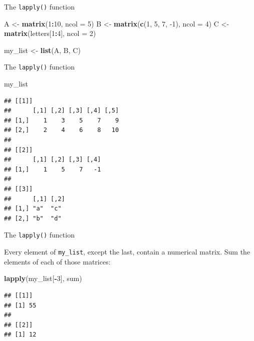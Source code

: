 \documentclass[ignorenonframetext,]{beamer}
\newenvironment{Shaded}{\begin{snugshade}}{\end{snugshade}}
\newcommand{\DataTypeTok}[1]{\textcolor[rgb]{0.13,0.29,0.53}{#1}}
\newcommand{\DecValTok}[1]{\textcolor[rgb]{0.00,0.00,0.81}{#1}}
\newcommand{\KeywordTok}[1]{\textcolor[rgb]{0.13,0.29,0.53}{\textbf{#1}}}
\newcommand{\NormalTok}[1]{#1}
\newcommand{\OperatorTok}[1]{\textcolor[rgb]{0.81,0.36,0.00}{\textbf{#1}}}
\newcommand{\StringTok}[1]{\textcolor[rgb]{0.31,0.60,0.02}{#1}}
\begin{document}
\begin{frame}[fragile]{The \texttt{lapply()} function}
\protect\hypertarget{the-lapply-function-2}{}

\begin{Shaded}
\begin{Highlighting}[]
\NormalTok{A <-}\StringTok{ }\KeywordTok{matrix}\NormalTok{(}\DecValTok{1}\OperatorTok{:}\DecValTok{10}\NormalTok{, }\DataTypeTok{ncol =} \DecValTok{5}\NormalTok{)}
\NormalTok{B <-}\StringTok{ }\KeywordTok{matrix}\NormalTok{(}\KeywordTok{c}\NormalTok{(}\DecValTok{1}\NormalTok{, }\DecValTok{5}\NormalTok{, }\DecValTok{7}\NormalTok{, }\DecValTok{-1}\NormalTok{), }\DataTypeTok{ncol =} \DecValTok{4}\NormalTok{)}
\NormalTok{C <-}\StringTok{ }\KeywordTok{matrix}\NormalTok{(letters[}\DecValTok{1}\OperatorTok{:}\DecValTok{4}\NormalTok{], }\DataTypeTok{ncol =} \DecValTok{2}\NormalTok{)}

\NormalTok{my_list <-}\StringTok{ }\KeywordTok{list}\NormalTok{(A, B, C)}
\end{Highlighting}
\end{Shaded}

\end{frame}

\begin{frame}[fragile]{The \texttt{lapply()} function}
\protect\hypertarget{the-lapply-function-3}{}

\begin{Shaded}
\begin{Highlighting}[]
\NormalTok{my_list}
\end{Highlighting}
\end{Shaded}

\begin{verbatim}
## [[1]]
##      [,1] [,2] [,3] [,4] [,5]
## [1,]    1    3    5    7    9
## [2,]    2    4    6    8   10
## 
## [[2]]
##      [,1] [,2] [,3] [,4]
## [1,]    1    5    7   -1
## 
## [[3]]
##      [,1] [,2]
## [1,] "a"  "c" 
## [2,] "b"  "d"
\end{verbatim}

\end{frame}

\begin{frame}[fragile]{The \texttt{lapply()} function}
\protect\hypertarget{the-lapply-function-4}{}

Every element of \texttt{my\_list}, except the last, contain a numerical
matrix. Sum the elements of each of those matrices:

\begin{Shaded}
\begin{Highlighting}[]
\KeywordTok{lapply}\NormalTok{(my_list[}\OperatorTok{-}\DecValTok{3}\NormalTok{], sum)}
\end{Highlighting}
\end{Shaded}

\begin{verbatim}
## [[1]]
## [1] 55
## 
## [[2]]
## [1] 12
\end{verbatim}

\end{frame}
\end{document}
